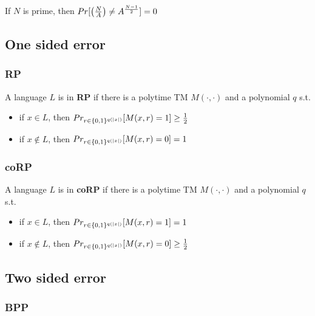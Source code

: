     If $N$ is prime, then $Pr [ \left(\frac{N}{A}\right) \neq A^{\frac{N-1}{2}} ] = 0$


\subsection{One sided error}\label{subsec:rand_one_sided}

    \subsubsection{\textbf{RP}}\label{subsubsec:rp}

        \begin{definition}[RP]\label{def:rp}
            A language $L$ is in \textbf{RP} if there is a polytime TM $M(\cdot, \cdot)$ and a polynomial $q$ s.t.
            \begin{itemize}
                \item if $x \in L$, then $Pr_{r \in \{ 0,1 \}^{q(\vert x \vert)}} [M(x,r) = 1] \geq \frac{1}{2} $
                \item if $x \not\in L$, then $Pr_{r \in \{ 0,1 \}^{q(\vert x \vert)}} [M(x,r) = 0] = 1 $
            \end{itemize}
        \end{definition}

    \subsubsection{\textbf{coRP}}\label{subsubsec:corp}

        \begin{definition}[coRP]\label{def:corp}
            A language $L$ is in \textbf{coRP} if there is a polytime TM $M(\cdot, \cdot)$ and a polynomial $q$ s.t.
            \begin{itemize}
                \item if $x \in L$, then $Pr_{r \in \{ 0,1 \}^{q(\vert x \vert)}} [M(x,r) = 1] = 1 $
                \item if $x \not\in L$, then $Pr_{r \in \{ 0,1 \}^{q(\vert x \vert)}} [M(x,r) = 0] \geq \frac{1}{2} $
            \end{itemize}
        \end{definition}


\subsection{Two sided error}\label{subsec:rand_two_sided}

    \subsubsection{\textbf{BPP}}\label{subsubsec:bpp}

